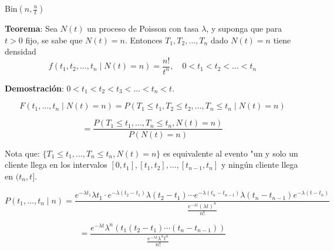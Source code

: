 \documentclass[12pt,a4paper]{article}
\newcommand{\teorema}[1]{%
\begin{teoremabox}
\textbf{Teorema}: #1
\end{teoremabox}
}
\begin{document}
\begin{center}
\end{center}

Bin$(n, \frac{u}{t})$

\teorema{Sea $N(t)$ un proceso de Poisson con tasa $\lambda$, y suponga que para $t > 0$ fijo, se sabe que $N(t) = n$. Entonces $T_1, T_2, \ldots, T_n$ dado $N(t) = n$ tiene densidad
\begin{equation*}
f(t_1, t_2, \ldots, t_n \mid N(t) = n) = \frac{n!}{t^n}, \quad 0 < t_1 < t_2 < \ldots < t_n
\end{equation*}}

\textbf{Demostración}: $0 < t_1 < t_2 < t_3 < \ldots < t_n < t$.

\begin{equation*}
F(t_1, \ldots, t_n \mid N(t) = n) = P(T_1 \leq t_1, T_2 \leq t_2, \ldots, T_n \leq t_n \mid N(t) = n)
\end{equation*}

\begin{equation*}
= \frac{P(T_1 \leq t_1, \ldots, T_n \leq t_n, N(t) = n)}{P(N(t) = n)}
\end{equation*}

Nota que: $\{T_1 \leq t_1, \ldots, T_n \leq t_n, N(t) = n\}$ es equivalente al evento "un y solo un cliente llega en los intervalos $[0, t_1], [t_1, t_2], \ldots, [t_{n-1}, t_n]$ y ningún cliente llega en $(t_n, t]$.

\begin{equation*}
P(t_1, \ldots, t_n \mid n) = \frac{e^{-\lambda t_1} \lambda t_1 \cdot e^{-\lambda(t_2-t_1)} \lambda(t_2-t_1) \cdots e^{-\lambda(t_n-t_{n-1})} \lambda(t_n-t_{n-1}) e^{-\lambda(t-t_n)}}{\frac{e^{-\lambda t} (\lambda t)^n}{n!}}
\end{equation*}

\begin{equation*}
= \frac{e^{-\lambda t} \lambda^n (t_1(t_2-t_1)\cdots(t_n-t_{n-1}))}{\frac{e^{-\lambda t} \lambda^n t^n}{n!}}
\end{equation*}
\end{document}
